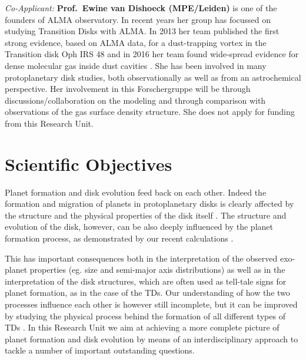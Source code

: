 \documentclass[10pt,fleqn,twoside]{article}
\begin{document}
{\it Co-Applicant:} {\bf Prof.\ Ewine van Dishoeck (MPE/Leiden)}
is one of the founders of ALMA observatory. In recent years her group
has focussed on studying Transition Disks with ALMA. In 2013 her team
published the first strong evidence, based on ALMA data, for a
dust-trapping vortex in the Transition disk Oph IRS 48 \citep{2013Sci...340.1199V}
and in 2016 her team found wide-spread
 evidence for dense molecular gas inside dust cavities \citep{2016A&A...585A..58V}. 
She has been
involved in many protoplanetary disk studies, both observationally as
well as from an astrochemical perspective. Her involvement in this Forschergruppe
will be through discussions/collaboration on the modeling and through comparison with
 observations of the gas surface density structure. She does not apply for 
funding from this Research Unit.\\


\section{Scientific Objectives}

Planet formation and disk evolution feed back on each other. Indeed
the formation and migration of planets in protoplanetary disks is
clearly affected by the structure and the physical properties of the
disk itself \citep[e.g.][to cite only a few of the works coming from our team]{2016arXiv161101070D, 2015MNRAS.450.3008E}. 
The
structure and evolution of the disk, however, can be also deeply
influenced by the planet formation process, as demonstrated by our
recent calculations \citep[e.g.,][]{2013MNRAS.430.1392R, 2015MNRAS.454.2173R}.

This has important consequences both in the interpretation of the observed
exo-planet properties (eg. size and semi-major axis distributions) as
well as in the interpretation of the disk structures, which are often
used as tell-tale signs for planet formation, as in the case of the
TDs. Our understanding of how the two processes
influence each other is however still incomplete, but it can be
improved by studying the physical process behind the formation of all
different types of TDs . 
In this Research Unit we aim at achieving a more complete picture of
planet formation and disk evolution by means of an interdisciplinary
approach to tackle a number of important outstanding questions. 
\\
\end{document}
